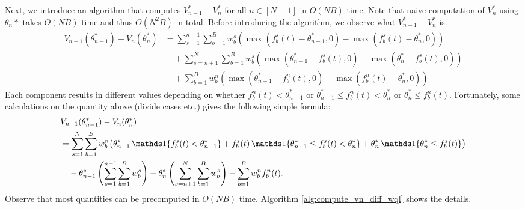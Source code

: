 \smallskip
Next, we introduce an algorithm that computes $V_{n-1}^* - V_n^*$ for all $n \in [N-1]$ in $O(NB)$ time. Note that naive computation of $V_n^*$ using $\theta_n*$ takes $O(NB)$ time and thus $O(N^2B)$ in total. Before introducing the algorithm, we observe what $V_{n-1}^* - V_n^*$ is.
\begin{align*} %
V_{n-1}(\theta_{n-1}^*) - V_n(\theta_n^*) 
& = \sum_{s=1}^{n-1} \sum_{b=1}^B w_b^s \left(\max(f_b^s(t)-\theta_{n-1}^*, 0) - \max(f_b^s(t)-\theta_n^*, 0)\right) \\
& \quad + \sum_{s=n+1}^{N}\sum_{b=1}^B  w_b^s \left(\max(\theta_{n-1}^* - f_b^s(t), 0) - \max(\theta_n^* - f_b^s(t), 0)\right) \\
& \quad + \sum_{b=1}^B w_b^n \left( \max(\theta_{n-1}^* - f_b^n(t), 0) - \max(f_b^n(t) - \theta_n^*, 0)\right)
\end{align*}
Each component results in different values depending on whether $f_b^n(t) < \theta_{n-1}^*$ or $\theta_{n-1}^* \leq f_b^n(t) < \theta_n^*$ or $\theta_n^* \leq f_b^n(t)$. Fortunately, some calculations on the quantity above (divide cases etc.) gives the following simple formula:
\begin{align*}
& V_{n-1}(\theta_{n-1}^*) - V_n(\theta_n^*) \\
& = \sum_{s=1}^N \sum_{b=1}^B w_b^n 
\bigl( \theta_{n-1}^* \, \indi{f_b^s(t) < \theta_{n-1}^*}  
+ f_b^s(t) \,\indi{\theta_{n-1}^* \leq f_b^s(t) < \theta_n^*}  
+ \theta_n^*  \, \indi{\theta_n^* \leq f_b^s(t)} \bigr)  \\
& \quad - \theta_{n-1}^*\left(\sum_{s=1}^{n-1} \sum_{b=1}^B w_b^s\right) - \theta_n^* \left(\sum_{s=n+1}^{N}\sum_{b=1}^B w_b^s\right) - \sum_{b=1}^B w_b^n f_b^n(t).
\end{align*}
Observe that most quantities can be precomputed in $O(NB)$ time. Algorithm \ref{alg:compute_vn_diff_wql} shows the details.

